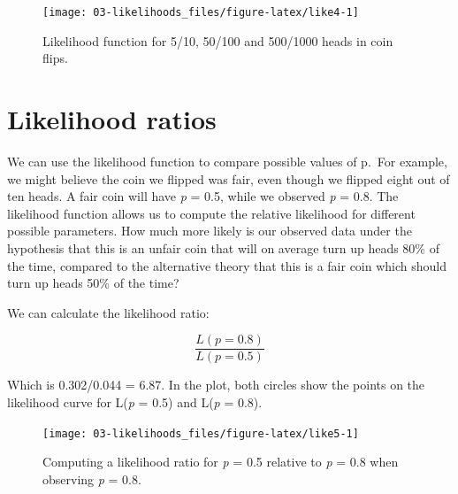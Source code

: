 \documentclass[
  oneside]{krantz}
\begin{document}
\begin{figure}

{\centering \texttt{[image: 03-likelihoods\_files/figure-latex/like4-1]} 

}

\caption{Likelihood function for 5/10, 50/100 and 500/1000 heads in coin flips.}\label{fig:like4}
\end{figure}

\hypertarget{likelihood-ratios}{%
\section{Likelihood ratios}\label{likelihood-ratios}}

We can use the likelihood function to compare possible values of p.~For example, we might believe the coin we flipped was fair, even though we flipped eight out of ten heads. A fair coin will have \emph{p} = 0.5, while we observed \emph{p} = 0.8. The likelihood function allows us to compute the relative likelihood for different possible parameters. How much more likely is our observed data under the hypothesis that this is an unfair coin that will on average turn up heads 80\% of the time, compared to the alternative theory that this is a fair coin which should turn up heads 50\% of the time?

We can calculate the likelihood ratio:

\[
\frac{L(p = 0.8)}{L(p = 0.5)}
\]

Which is 0.302/0.044 = 6.87. In the plot, both circles show the points on
the likelihood curve for L(\emph{p} = 0.5) and L(\emph{p} = 0.8).



\begin{figure}

{\centering \texttt{[image: 03-likelihoods\_files/figure-latex/like5-1]} 

}

\caption{Computing a likelihood ratio for \emph{p} = 0.5 relative to \emph{p} = 0.8 when observing \emph{p} = 0.8.}\label{fig:like5}
\end{figure}
\end{document}

